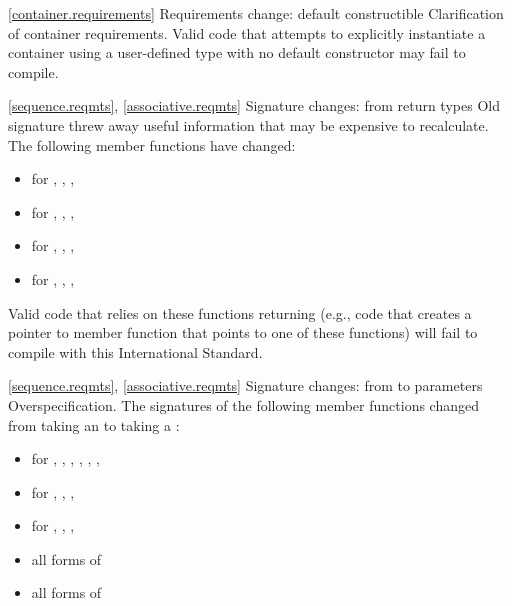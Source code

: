 \ref{container.requirements}
\change Requirements change: default constructible
\rationale Clarification of container requirements.
\effect
Valid \CppIII code that attempts to explicitly instantiate a container using
a user-defined type with no default constructor may fail to compile.

\ref{sequence.reqmts}, \ref{associative.reqmts}
\change Signature changes: from  return types
\rationale Old signature threw away useful information that may be expensive
to recalculate.
\effect
The following member functions have changed:
\begin{itemize}
\item {} for , , , 
\item {} for , , , 
\item {} for , , , 
\item {} for , , , 
\end{itemize}

Valid \CppIII code that relies on these functions returning 
(e.g., code that creates a pointer to member function that points to one
of these functions) will fail to compile with this International Standard.

\ref{sequence.reqmts}, \ref{associative.reqmts}
\change Signature changes: from  to 
parameters
\rationale Overspecification.
\effects
The signatures of the following member functions changed from taking an
 to taking a :

\begin{itemize}
\item {} for , , ,
, , , 
\item {} for , , ,
\item {} for , , , 
\item all forms of 
\item all forms of 
\end{itemize}


